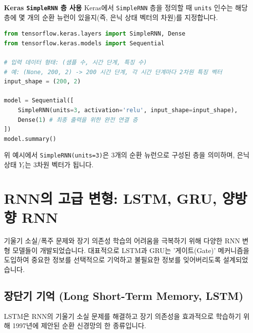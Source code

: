 \documentclass[11pt,a4paper]{article}
\theoremstyle{definition}
\begin{document}
\begin{enumerate}
    \begin{tipbox}
    \textbf{Keras \texttt{SimpleRNN} 층 사용}
    Keras에서 \texttt{SimpleRNN} 층을 정의할 때 \texttt{units} 인수는 해당 층에 몇 개의 순환 뉴런이 있을지(즉, 은닉 상태 벡터의 차원)를 지정합니다.
    \begin{lstlisting}[language=Python, caption=Keras SimpleRNN 층 정의 예시, label=lst:simplernn_layer]
from tensorflow.keras.layers import SimpleRNN, Dense
from tensorflow.keras.models import Sequential

# 입력 데이터 형태: (샘플 수, 시간 단계, 특징 수)
# 예: (None, 200, 2) -> 200 시간 단계, 각 시간 단계마다 2차원 특징 벡터
input_shape = (200, 2) 

model = Sequential([
    SimpleRNN(units=3, activation='relu', input_shape=input_shape),
    Dense(1) # 최종 출력을 위한 완전 연결 층
])
model.summary()
    \end{lstlisting}
    위 예시에서 \texttt{SimpleRNN(units=3)}은 3개의 순환 뉴런으로 구성된 층을 의미하며, 은닉 상태 $Y_t$는 3차원 벡터가 됩니다.
    \end{tipbox}
\end{enumerate}

\newpage
\section{RNN의 고급 변형: LSTM, GRU, 양방향 RNN}
기울기 소실/폭주 문제와 장기 의존성 학습의 어려움을 극복하기 위해 다양한 RNN 변형 모델들이 개발되었습니다. 대표적으로 LSTM과 GRU는 '게이트(Gate)' 메커니즘을 도입하여 중요한 정보를 선택적으로 기억하고 불필요한 정보를 잊어버리도록 설계되었습니다.

\subsection{장단기 기억 (Long Short-Term Memory, LSTM)}
LSTM은 RNN의 기울기 소실 문제를 해결하고 장기 의존성을 효과적으로 학습하기 위해 1997년에 제안된 순환 신경망의 한 종류입니다.
\end{document}
